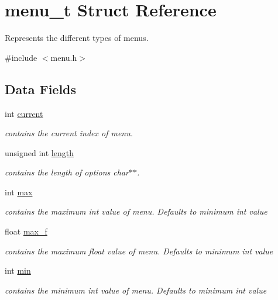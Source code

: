 \hypertarget{structmenu__t}{}\section{menu\+\_\+t Struct Reference}
\label{structmenu__t}


Represents the different types of menus.  




{\ttfamily \#include $<$menu.\+h$>$}

\subsection*{Data Fields}
\begin{DoxyCompactItemize}
\item 
int \hyperlink{structmenu__t_a2acb18066898677ec5e2dc40eec811c5}{current}
\begin{DoxyCompactList}\small\item\em contains the current index of menu. \end{DoxyCompactList}\item 
unsigned int \hyperlink{structmenu__t_a023063461c4a247e574abd6a55faf765}{length}
\begin{DoxyCompactList}\small\item\em contains the length of options char$\ast$$\ast$. \end{DoxyCompactList}\item 
int \hyperlink{structmenu__t_ace9cbaecd7bf311be0ef230da657f406}{max}
\begin{DoxyCompactList}\small\item\em contains the maximum int value of menu. Defaults to minimum int value \end{DoxyCompactList}\item 
float \hyperlink{structmenu__t_a14b11d0a7610484462c8a6e93068a2c1}{max\+\_\+f}
\begin{DoxyCompactList}\small\item\em contains the maximum float value of menu. Defaults to minimum int value \end{DoxyCompactList}\item 
int \hyperlink{structmenu__t_a6891bc6c94f1e995cc62a05b13328de5}{min}
\begin{DoxyCompactList}\small\item\em contains the minimum int value of menu. Defaults to minimum int value \end{DoxyCompactList}\item 

\end{DoxyCompactItemize}
